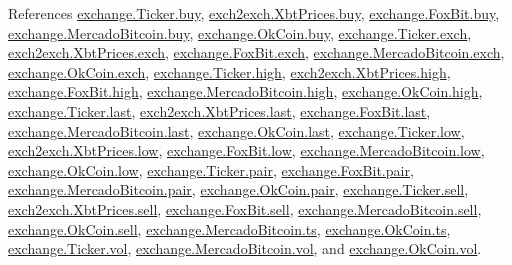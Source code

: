 References \hyperlink{exchange_8py_source_l00048}{exchange.\+Ticker.\+buy}, \hyperlink{exch2exch_8py_source_l00059}{exch2exch.\+Xbt\+Prices.\+buy}, \hyperlink{exchange_8py_source_l00235}{exchange.\+Fox\+Bit.\+buy}, \hyperlink{exchange_8py_source_l00297}{exchange.\+Mercado\+Bitcoin.\+buy}, \hyperlink{exchange_8py_source_l00362}{exchange.\+Ok\+Coin.\+buy}, \hyperlink{exchange_8py_source_l00045}{exchange.\+Ticker.\+exch}, \hyperlink{exch2exch_8py_source_l00064}{exch2exch.\+Xbt\+Prices.\+exch}, \hyperlink{exchange_8py_source_l00228}{exchange.\+Fox\+Bit.\+exch}, \hyperlink{exchange_8py_source_l00294}{exchange.\+Mercado\+Bitcoin.\+exch}, \hyperlink{exchange_8py_source_l00359}{exchange.\+Ok\+Coin.\+exch}, \hyperlink{exchange_8py_source_l00050}{exchange.\+Ticker.\+high}, \hyperlink{exch2exch_8py_source_l00061}{exch2exch.\+Xbt\+Prices.\+high}, \hyperlink{exchange_8py_source_l00237}{exchange.\+Fox\+Bit.\+high}, \hyperlink{exchange_8py_source_l00299}{exchange.\+Mercado\+Bitcoin.\+high}, \hyperlink{exchange_8py_source_l00364}{exchange.\+Ok\+Coin.\+high}, \hyperlink{exchange_8py_source_l00052}{exchange.\+Ticker.\+last}, \hyperlink{exch2exch_8py_source_l00063}{exch2exch.\+Xbt\+Prices.\+last}, \hyperlink{exchange_8py_source_l00239}{exchange.\+Fox\+Bit.\+last}, \hyperlink{exchange_8py_source_l00301}{exchange.\+Mercado\+Bitcoin.\+last}, \hyperlink{exchange_8py_source_l00366}{exchange.\+Ok\+Coin.\+last}, \hyperlink{exchange_8py_source_l00051}{exchange.\+Ticker.\+low}, \hyperlink{exch2exch_8py_source_l00062}{exch2exch.\+Xbt\+Prices.\+low}, \hyperlink{exchange_8py_source_l00238}{exchange.\+Fox\+Bit.\+low}, \hyperlink{exchange_8py_source_l00300}{exchange.\+Mercado\+Bitcoin.\+low}, \hyperlink{exchange_8py_source_l00365}{exchange.\+Ok\+Coin.\+low}, \hyperlink{exchange_8py_source_l00046}{exchange.\+Ticker.\+pair}, \hyperlink{exchange_8py_source_l00229}{exchange.\+Fox\+Bit.\+pair}, \hyperlink{exchange_8py_source_l00295}{exchange.\+Mercado\+Bitcoin.\+pair}, \hyperlink{exchange_8py_source_l00360}{exchange.\+Ok\+Coin.\+pair}, \hyperlink{exchange_8py_source_l00049}{exchange.\+Ticker.\+sell}, \hyperlink{exch2exch_8py_source_l00058}{exch2exch.\+Xbt\+Prices.\+sell}, \hyperlink{exchange_8py_source_l00236}{exchange.\+Fox\+Bit.\+sell}, \hyperlink{exchange_8py_source_l00298}{exchange.\+Mercado\+Bitcoin.\+sell}, \hyperlink{exchange_8py_source_l00363}{exchange.\+Ok\+Coin.\+sell}, \hyperlink{exchange_8py_source_l00296}{exchange.\+Mercado\+Bitcoin.\+ts}, \hyperlink{exchange_8py_source_l00361}{exchange.\+Ok\+Coin.\+ts}, \hyperlink{exchange_8py_source_l00053}{exchange.\+Ticker.\+vol}, \hyperlink{exchange_8py_source_l00302}{exchange.\+Mercado\+Bitcoin.\+vol}, and \hyperlink{exchange_8py_source_l00367}{exchange.\+Ok\+Coin.\+vol}.


